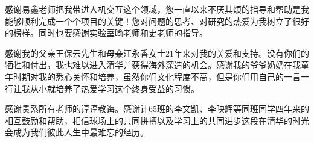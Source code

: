 
\begin{acknowledgements}
  
  感谢易鑫老师把我带进人机交互这个领域，您一直以来不厌其烦的指导和帮助是我能够顺利完成一个个项目的关键！您对问题的思考、对研究的热爱为我树立了很好的榜样。同时也要感谢实验室喻老师和史老师的指导。

  感谢我的父亲王保云先生和母亲汪永香女士21年来对我的关爱和支持。没有你们的牺牲和付出，我也难以进入清华并获得海外深造的机会。感谢我的爷爷奶奶在我童年时期对我的悉心关怀和培养，虽然你们文化程度不高，但是你们用自己的一言一行让我从小就培养了热爱学习这个终身受益的习惯。

  感谢贵系所有老师的谆谆教诲。感谢计65班的李文凯、李映辉等同班同学四年来的相互鼓励和帮助，相信球场上的共同拼搏以及学习上的共同进步这段在清华的时光会成为我们彼此人生中最难忘的经历。
\end{acknowledgements}
